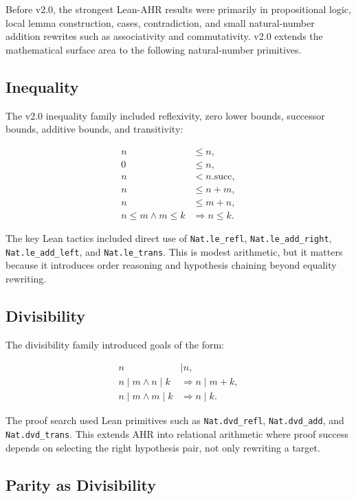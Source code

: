 \documentclass[11pt]{article}
\begin{document}
Before v2.0, the strongest Lean-AHR results were primarily in propositional logic, local lemma construction, cases,
contradiction, and small natural-number addition rewrites such as associativity and commutativity. v2.0 extends the
mathematical surface area to the following natural-number primitives.

\subsection{Inequality}

The v2.0 inequality family included reflexivity, zero lower bounds, successor bounds, additive bounds, and
transitivity:

\begin{align*}
n &\le n,\\
0 &\le n,\\
n &< n.\mathrm{succ},\\
n &\le n + m,\\
n &\le m + n,\\
n \le m \wedge m \le k &\Rightarrow n \le k.
\end{align*}

The key Lean tactics included direct use of \texttt{Nat.le\_refl}, \texttt{Nat.le\_add\_right},
\texttt{Nat.le\_add\_left}, and \texttt{Nat.le\_trans}. This is modest arithmetic, but it matters because it
introduces order reasoning and hypothesis chaining beyond equality rewriting.

\subsection{Divisibility}

The divisibility family introduced goals of the form:

\begin{align*}
n &\mid n,\\
n \mid m \wedge n \mid k &\Rightarrow n \mid m+k,\\
n \mid m \wedge m \mid k &\Rightarrow n \mid k.
\end{align*}

The proof search used Lean primitives such as \texttt{Nat.dvd\_refl}, \texttt{Nat.dvd\_add}, and
\texttt{Nat.dvd\_trans}. This extends AHR into relational arithmetic where proof success depends on selecting the
right hypothesis pair, not only rewriting a target.

\subsection{Parity as Divisibility}
\end{document}
